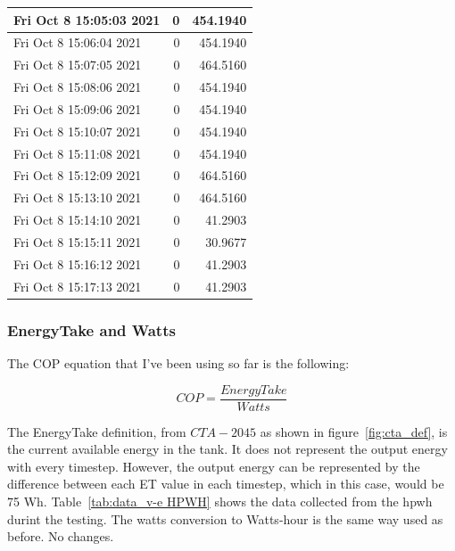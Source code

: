 \begin{longtable}{|l|r|r|}
Fri Oct  8 15:05:03 2021 &                  0 &        454.1940 \\ \hline
Fri Oct  8 15:06:04 2021 &                  0 &        454.1940 \\ \hline
Fri Oct  8 15:07:05 2021 &                  0 &        464.5160 \\ \hline
Fri Oct  8 15:08:06 2021 &                  0 &        454.1940 \\ \hline
Fri Oct  8 15:09:06 2021 &                  0 &        454.1940 \\ \hline
Fri Oct  8 15:10:07 2021 &                  0 &        454.1940 \\ \hline
Fri Oct  8 15:11:08 2021 &                  0 &        454.1940 \\ \hline
Fri Oct  8 15:12:09 2021 &                  0 &        464.5160 \\ \hline
Fri Oct  8 15:13:10 2021 &                  0 &        464.5160 \\ \hline
Fri Oct  8 15:14:10 2021 &                  0 &         41.2903 \\ \hline
Fri Oct  8 15:15:11 2021 &                  0 &         30.9677 \\ \hline
Fri Oct  8 15:16:12 2021 &                  0 &         41.2903 \\ \hline
Fri Oct  8 15:17:13 2021 &                  0 &         41.2903 \\ \hline

\end{longtable}


\subsubsection{EnergyTake and Watts}

The COP equation that I've been using so far is the following:

\begin{equation}
    COP = \frac{EnergyTake}{Watts}
\end{equation}

The EnergyTake definition, from $CTA-2045$ as shown in figure~\ref{fig:cta_def}, is the current available energy in the tank. It does not represent the output energy with every timestep. However, the output energy can be represented by the difference between each ET value in each timestep, which in this case, would be 75 Wh. Table~\ref{tab:data_v-e HPWH} shows the data collected from the \gls{hpwh} durint the testing. The watts conversion to Watts-hour is the same way used as before. No changes. 

